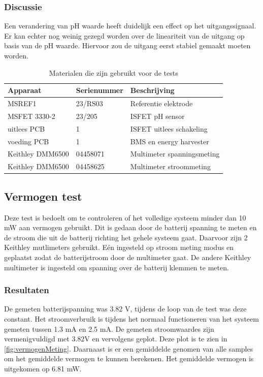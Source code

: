 \subsubsection{Discussie}
Een verandering van pH waarde heeft duidelijk een effect op het uitgangssignaal. Er kan echter nog weinig gezegd worden over de lineariteit van de uitgang op basis van de pH waarde. Hiervoor zou de uitgang eerst stabiel gemaakt moeten worden.


\begin{table}[ht]
    \centering
    \begin{tabular}{l|l|l}
        Apparaat         & Serienummer & Beschrijving \\
        \hline
        MSREF1           & 23/RS03     & Referentie elektrode       \\
        MSFET 3330-2     & 23/205      & ISFET pH sensor            \\
        uitlees PCB      & 1           & ISFET uitlees schakeling   \\
        voeding PCB      & 1           & BMS en energy harvester    \\    
        Keithley DMM6500 & 04458071    & Multimeter spanningsmeting \\
        Keithley DMM6500 & 04458625    & Multimeter stroommeting    \\
        \hline
    \end{tabular}
    \caption{Materialen die zijn gebruikt voor de tests}
    \label{tab:testMaterialen2}
\end{table}


\subsection{Vermogen test}
Deze test is bedoelt om te controleren of het volledige systeem minder dan 10 mW aan vermogen gebruikt. Dit is gedaan door de batterij spanning te meten en de stroom die uit de batterij richting het gehele systeem gaat. Daarvoor zijn 2 Keithley mutlimeters gebruikt. Eén ingesteld op stroom meting modus en geplaatst zodat de batterijstroom door de multimeter gaat. De andere Keithley multimeter is ingesteld om spanning over de batterij klemmen te meten. 

\subsubsection{Resultaten}
De gemeten batterijspanning was 3.82 V, tijdens de loop van de test was deze constant. Het stroomverbruik is tijdens het normaal functioneren van het systeem gemeten tussen 1.3 mA en 2.5 mA. De gemeten stroomwaardes zijn vermenigvuldigd met 3.82V en vervolgens geplot. Deze plot is te zien in \cref{fig:vermogenMeting}. Daarnaast is er een gemiddelde genomen van alle samples om het gemiddelde vermogen te kunnen berekenen. Het gemiddelde vermogen is uitgekomen op 6.81 mW. 

